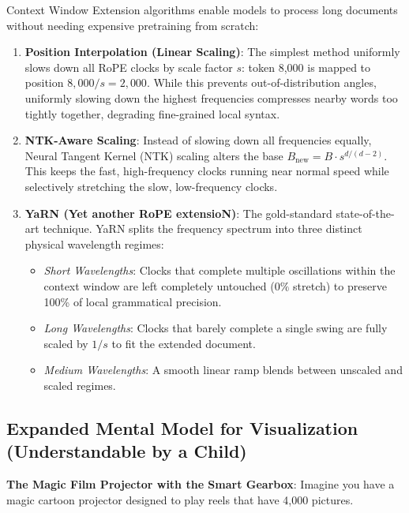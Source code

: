 \documentclass[11pt,a4paper]{article}
\theoremstyle{definition}
\begin{document}
Context Window Extension algorithms enable models to process long documents without needing expensive pretraining from scratch:
\begin{enumerate}
    \item \textbf{Position Interpolation (Linear Scaling)}: The simplest method uniformly slows down all RoPE clocks by scale factor $s$: token 8,000 is mapped to position $8,000 / s = 2,000$. While this prevents out-of-distribution angles, uniformly slowing down the highest frequencies compresses nearby words too tightly together, degrading fine-grained local syntax.
    \item \textbf{NTK-Aware Scaling}: Instead of slowing down all frequencies equally, Neural Tangent Kernel (NTK) scaling alters the base $B_{\text{new}} = B \cdot s^{d / (d-2)}$. This keeps the fast, high-frequency clocks running near normal speed while selectively stretching the slow, low-frequency clocks.
    \item \textbf{YaRN (Yet another RoPE extensioN)}: The gold-standard state-of-the-art technique. YaRN splits the frequency spectrum into three distinct physical wavelength regimes:
    \begin{itemize}
        \item \emph{Short Wavelengths}: Clocks that complete multiple oscillations within the context window are left completely untouched ($0\%$ stretch) to preserve 100\% of local grammatical precision.
        \item \emph{Long Wavelengths}: Clocks that barely complete a single swing are fully scaled by $1/s$ to fit the extended document.
        \item \emph{Medium Wavelengths}: A smooth linear ramp blends between unscaled and scaled regimes.
    \end{itemize}
\end{enumerate}

\subsection{Expanded Mental Model for Visualization (Understandable by a Child)}
\textbf{The Magic Film Projector with the Smart Gearbox}:
Imagine you have a magic cartoon projector designed to play reels that have 4,000 pictures.
\end{document}
